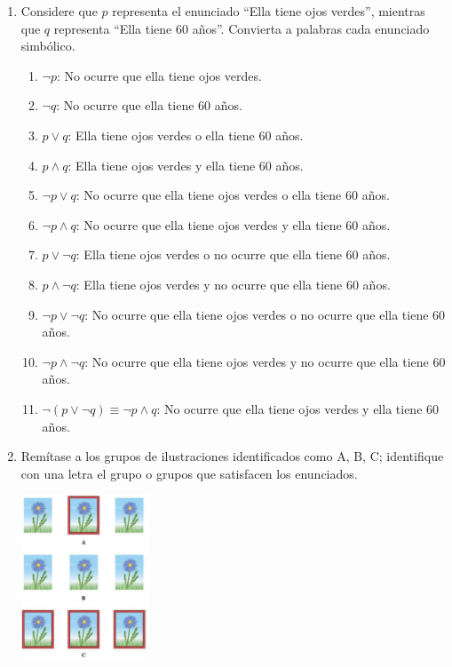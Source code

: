 \documentclass[12pt,letterpaper]{exam}
\begin{document}
\begin{enumerate}
  \item Considere que $p$ representa el enunciado “Ella tiene ojos verdes”, mientras que $q$ representa “Ella tiene 60 años”. Convierta a palabras cada enunciado simbólico.
  \begin{enumerate}[label=\alph*)]
    \item $\neg p$: No ocurre que ella tiene ojos verdes.
    \item $\neg q$: No ocurre que ella tiene 60 años.
    \item $p \lor q$: Ella tiene ojos verdes o ella tiene 60 años.
    \item $p \land q$: Ella tiene ojos verdes y ella tiene 60 años.
    \item $\neg p \lor q$: No ocurre que ella tiene ojos verdes o ella tiene 60 años.
    \item $\neg p \land q$: No ocurre que ella tiene ojos verdes y ella tiene 60 años.
    \item $p \lor \neg q$: Ella tiene ojos verdes o no ocurre que ella tiene 60 años.
    \item $p \land \neg q$: Ella tiene ojos verdes y no ocurre que ella tiene 60 años.
    \item $\neg p \lor \neg q$: No ocurre que ella tiene ojos verdes o no ocurre que ella tiene 60 años.
    \item $\neg p \land \neg q$: No ocurre que ella tiene ojos verdes y no ocurre que ella tiene 60 años.
    \item $\neg(p \lor \neg q) \equiv \neg p \land q$: No ocurre que ella tiene ojos verdes y ella tiene 60 años.
  \end{enumerate}

  \item Remítase a los grupos de ilustraciones identificados como A, B, C; identifique con una letra el grupo o
  grupos que satisfacen los enunciados.

  \begin{center}
    \includegraphics[width=0.3\textwidth]{../assets/Talleres_fundamentos/Taller1_imagen1.png}
  \end{center}


\end{enumerate}
\end{document}
